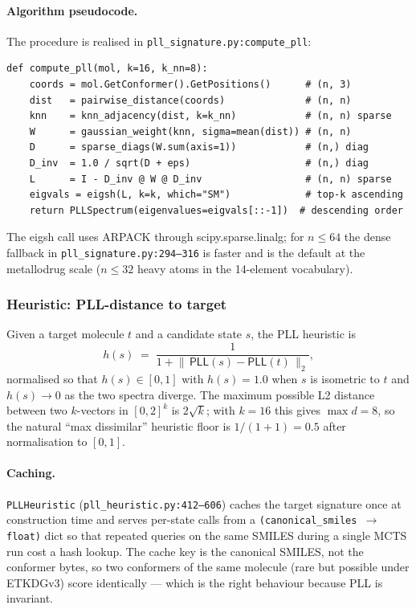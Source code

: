 \paragraph{Algorithm pseudocode.}
The procedure is realised in
\texttt{pll\_signature.py:compute\_pll}:

\begin{verbatim}
def compute_pll(mol, k=16, k_nn=8):
    coords = mol.GetConformer().GetPositions()      # (n, 3)
    dist   = pairwise_distance(coords)              # (n, n)
    knn    = knn_adjacency(dist, k=k_nn)            # (n, n) sparse
    W      = gaussian_weight(knn, sigma=mean(dist)) # (n, n)
    D      = sparse_diags(W.sum(axis=1))            # (n,) diag
    D_inv  = 1.0 / sqrt(D + eps)                    # (n,) diag
    L      = I - D_inv @ W @ D_inv                  # (n, n) sparse
    eigvals = eigsh(L, k=k, which="SM")             # top-k ascending
    return PLLSpectrum(eigenvalues=eigvals[::-1])  # descending order
\end{verbatim}

The eigsh call uses ARPACK through scipy.sparse.linalg; for
$n \le 64$ the dense fallback in
\texttt{pll\_signature.py:294--316} is faster and is the
default at the metallodrug scale ($n \le 32$ heavy atoms in
the 14-element vocabulary).

\subsubsection{Heuristic: PLL-distance to target}
\label{sec:pll-heuristic-form}

Given a target molecule $t$ and a candidate state $s$, the
PLL heuristic is
\begin{equation}
  \label{eq:pll-heuristic}
  h(s) \;=\; \frac{1}{1 + \bigl\|\, \mathsf{PLL}(s) - \mathsf{PLL}(t) \,\bigr\|_2},
\end{equation}
normalised so that $h(s) \in [0,1]$ with $h(s) = 1.0$ when
$s$ is isometric to $t$ and $h(s) \to 0$ as the two spectra
diverge.  The maximum possible L2 distance between two
$k$-vectors in $[0,2]^k$ is $2\sqrt{k}$; with $k=16$ this
gives $\max d = 8$, so the natural ``max dissimilar''
heuristic floor is $1 / (1 + 1) = 0.5$ after normalisation
to $[0,1]$.

\paragraph{Caching.}
\texttt{PLLHeuristic} (\texttt{pll\_heuristic.py:412--606})
caches the target signature once at construction time and
serves per-state calls from a
\texttt{(canonical\_smiles $\to$ float)} dict so that
repeated queries on the same SMILES during a single MCTS run
cost a hash lookup.  The cache key is the canonical SMILES,
not the conformer bytes, so two conformers of the same
molecule (rare but possible under ETKDGv3) score identically
--- which is the right behaviour because PLL is invariant.

